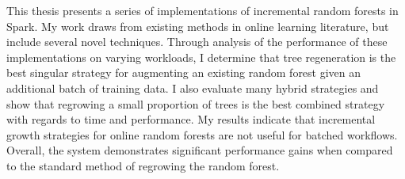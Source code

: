 % 
% 
%

This thesis presents a series of implementations of incremental random forests in Spark. My work draws from existing methods in online learning literature, but include several novel techniques. Through analysis of the performance of these implementations on varying workloads, I determine that tree regeneration is the best singular strategy for augmenting an existing random forest given an additional batch of training data. I also evaluate many hybrid strategies and show that regrowing a small proportion of trees is the best combined strategy with regards to time and performance. My results indicate that incremental growth strategies for online random forests are not useful for batched workflows. Overall, the system demonstrates significant performance gains when compared to the standard method of regrowing the random forest. 